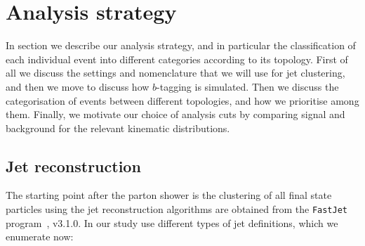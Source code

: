 
\section{Analysis strategy}
\label{sec:analysis}

In section we describe our analysis strategy, and in particular
the classification of each individual event into
different categories according to its topology.
%
First of all we discuss the settings and nomenclature that
we will use for jet clustering, and then we move to discuss how $b$-tagging is simulated.
%
Then we discuss the categorisation of events between different
topologies, and how we prioritise among them.
%
Finally, we motivate our choice of analysis cuts by comparing signal and background
for the relevant kinematic distributions.

\subsection{Jet reconstruction}

The starting point after the parton shower is the clustering
of all final state particles using the
jet reconstruction algorithms
are obtained from the {\tt FastJet} program~\cite{Cacciari:2011ma},
v3.1.0.
%
In our study use different types of jet definitions,
which we enumerate now:
%


